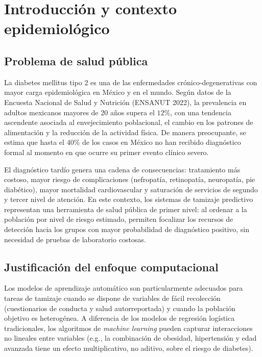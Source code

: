 \documentclass[12pt,a4paper]{article}
\begin{document}
\section{Introducción y contexto epidemiológico}

\subsection{Problema de salud pública}

La diabetes mellitus tipo 2 es una de las enfermedades crónico-degenerativas con mayor carga epidemiológica en México y en el mundo. Según datos de la Encuesta Nacional de Salud y Nutrición (ENSANUT 2022), la prevalencia en adultos mexicanos mayores de 20 años supera el $12\%$, con una tendencia ascendente asociada al envejecimiento poblacional, el cambio en los patrones de alimentación y la reducción de la actividad física. De manera preocupante, se estima que hasta el $40\%$ de los casos en México no han recibido diagnóstico formal al momento en que ocurre su primer evento clínico severo.

El diagnóstico tardío genera una cadena de consecuencias: tratamiento más costoso, mayor riesgo de complicaciones (nefropatía, retinopatía, neuropatía, pie diabético), mayor mortalidad cardiovascular y saturación de servicios de segundo y tercer nivel de atención. En este contexto, los sistemas de tamizaje predictivo representan una herramienta de salud pública de primer nivel: al ordenar a la población por nivel de riesgo estimado, permiten focalizar los recursos de detección hacia los grupos con mayor probabilidad de diagnóstico positivo, sin necesidad de pruebas de laboratorio costosas.

\subsection{Justificación del enfoque computacional}

Los modelos de aprendizaje automático son particularmente adecuados para tareas de tamizaje cuando se dispone de variables de fácil recolección (cuestionarios de conducta y salud autorreportada) y cuando la población objetivo es heterogénea. A diferencia de los modelos de regresión logística tradicionales, los algoritmos de \textit{machine learning} pueden capturar interacciones no lineales entre variables (e.g., la combinación de obesidad, hipertensión y edad avanzada tiene un efecto multiplicativo, no aditivo, sobre el riesgo de diabetes).
\end{document}
